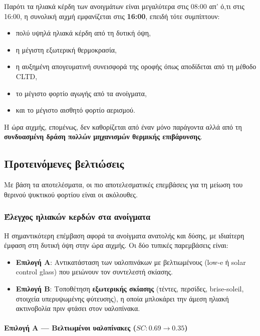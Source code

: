 \documentclass[12pt,a4paper]{article}
\begin{document}
Παρότι τα ηλιακά κέρδη των ανοιγμάτων είναι μεγαλύτερα στις 08:00 απ' ό,τι στις 16:00,
η συνολική αιχμή εμφανίζεται στις \textbf{16:00}, επειδή τότε συμπίπτουν:

\begin{itemize}
\item πολύ υψηλά ηλιακά κέρδη από τη δυτική όψη,
\item η μέγιστη εξωτερική θερμοκρασία,
\item η αυξημένη απογευματινή συνεισφορά της οροφής όπως αποδίδεται από τη μέθοδο
\textenglish{CLTD},
\item το μέγιστο φορτίο αγωγής από τα ανοίγματα,
\item και το μέγιστο αισθητό φορτίο αερισμού.
\end{itemize}

Η ώρα αιχμής, επομένως, δεν καθορίζεται από έναν μόνο παράγοντα αλλά από τη
\textbf{συνδυασμένη δράση πολλών μηχανισμών θερμικής επιβάρυνσης}.

\subsection{Προτεινόμενες βελτιώσεις}

Με βάση τα αποτελέσματα, οι πιο αποτελεσματικές επεμβάσεις για τη μείωση του θερινού
ψυκτικού φορτίου είναι οι ακόλουθες.

\subsubsection{Έλεγχος ηλιακών κερδών στα ανοίγματα}

Η σημαντικότερη επέμβαση αφορά τα ανοίγματα ανατολής και δύσης, με ιδιαίτερη έμφαση
στη δυτική όψη στην ώρα αιχμής. Οι δύο τυπικές παρεμβάσεις είναι:

\begin{itemize}
\item \textbf{Επιλογή Α}: Αντικατάσταση των υαλοπινάκων με βελτιωμένους
(\textenglish{low-e} ή \textenglish{solar control glass}) που μειώνουν τον
συντελεστή σκίασης.
\item \textbf{Επιλογή Β}: Τοποθέτηση \textbf{εξωτερικής σκίασης} (τέντες,
περσίδες, brise-soleil, στοιχεία υπερυψωμένης φύτευσης), η οποία μπλοκάρει την
άμεση ηλιακή ακτινοβολία πριν φτάσει στον υαλοπίνακα.
\end{itemize}

\paragraph{Επιλογή Α — Βελτιωμένοι υαλοπίνακες (\(SC: 0.69 \rightarrow 0.35\))}
\end{document}
